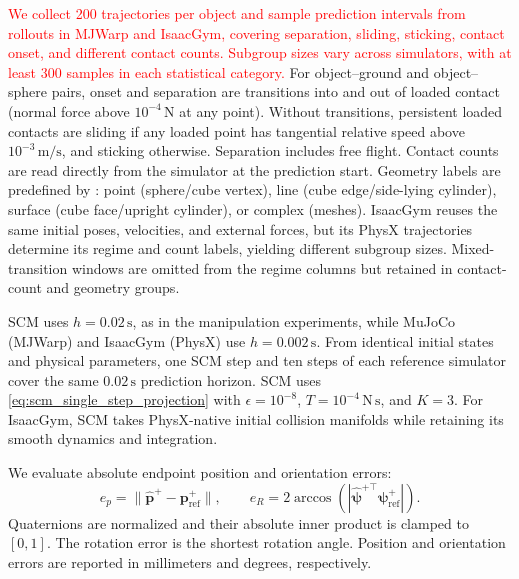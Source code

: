  \textcolor{red}{We collect 200 trajectories per object and sample prediction intervals from rollouts in MJWarp and IsaacGym, covering separation, sliding, sticking, contact onset, and different contact counts. Subgroup sizes vary across simulators, with at least 300 samples in each statistical category.} For object--ground and object--sphere pairs, onset and separation are transitions into and out of loaded contact (normal force above $10^{-4}\,\mathrm{N}$ at any point). Without transitions, persistent loaded contacts are sliding if any loaded point has tangential relative speed above $10^{-3}\,\mathrm{m/s}$, and sticking otherwise. Separation includes free flight. Contact counts are read directly from the simulator at the prediction start. Geometry labels are predefined by  : point (sphere/cube vertex), line (cube edge/side-lying cylinder), surface (cube face/upright cylinder), or complex (meshes). IsaacGym reuses the same initial poses, velocities, and external forces, but its PhysX trajectories determine its regime and count labels, yielding different subgroup sizes. Mixed-transition windows are omitted from the regime columns but retained in contact-count and geometry groups.

SCM uses $h=0.02\,\mathrm{s}$, as in the manipulation experiments, while MuJoCo (MJWarp) and IsaacGym (PhysX) use $h=0.002\,\mathrm{s}$. From identical initial states and physical parameters, one SCM step and ten steps of each reference simulator cover the same $0.02\,\mathrm{s}$ prediction horizon. SCM uses \eqref{eq:scm_single_step_projection} with $\epsilon=10^{-8}$, $T=10^{-4}\,\mathrm{N\,s}$, and $K=3$. For IsaacGym, SCM takes PhysX-native initial collision manifolds while retaining its smooth dynamics and integration.

We evaluate absolute endpoint position and orientation errors:
\begin{equation}
e_p=\|\hat{\boldsymbol p}^{+}-\boldsymbol p_{\mathrm{ref}}^{+}\|,\qquad
 e_R=2\arccos\!\left(\left|\hat{\boldsymbol\psi}^{+\top}\boldsymbol\psi_{\mathrm{ref}}^{+}\right|\right).
\label{eq:scm_absolute_pose_error}
\end{equation}
Quaternions are normalized and their absolute inner product is clamped to $[0,1]$. The rotation error is the shortest rotation angle. Position and orientation errors are reported in millimeters and degrees, respectively.

